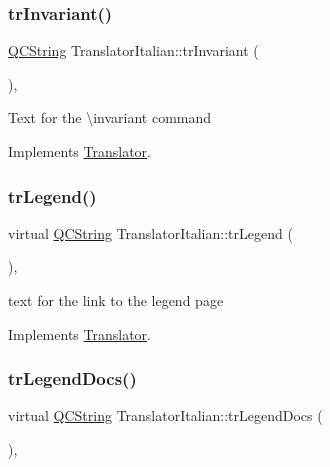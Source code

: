 \subsubsection{\texorpdfstring{trInvariant()}{trInvariant()}}
{\footnotesize\ttfamily \mbox{\hyperlink{class_q_c_string}{Q\+C\+String}} Translator\+Italian\+::tr\+Invariant (\begin{DoxyParamCaption}{ }\end{DoxyParamCaption})\hspace{0.3cm}{\ttfamily [inline]}, {\ttfamily [virtual]}}

Text for the \textbackslash{}invariant command 

Implements \mbox{\hyperlink{class_translator}{Translator}}.

\mbox{\label{class_translator_italian_aee7be174220a1e00c4d2e42e240baf3b}} 
\subsubsection{\texorpdfstring{trLegend()}{trLegend()}}
{\footnotesize\ttfamily virtual \mbox{\hyperlink{class_q_c_string}{Q\+C\+String}} Translator\+Italian\+::tr\+Legend (\begin{DoxyParamCaption}{ }\end{DoxyParamCaption})\hspace{0.3cm}{\ttfamily [inline]}, {\ttfamily [virtual]}}

text for the link to the legend page 

Implements \mbox{\hyperlink{class_translator}{Translator}}.

\mbox{\label{class_translator_italian_a5ce89ace96901e814979cd3432febfb8}} 
\subsubsection{\texorpdfstring{trLegendDocs()}{trLegendDocs()}}
{\footnotesize\ttfamily virtual \mbox{\hyperlink{class_q_c_string}{Q\+C\+String}} Translator\+Italian\+::tr\+Legend\+Docs (\begin{DoxyParamCaption}{ }\end{DoxyParamCaption})\hspace{0.3cm}{\ttfamily [inline]}, {\ttfamily [virtual]}}

